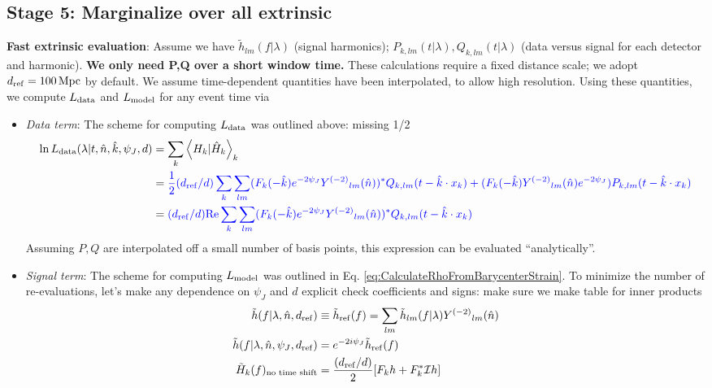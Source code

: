 \documentclass[twocolumn,prd,nofootinbib]{revtex4}
\newcommand\editremark[1]{{\color{red} #1}}
\newcommand\unit[1]{\, {\rm #1}}
\newcommand\Y[1]{Y^{(#1)}{}}
\newcommand\qmstateproduct[2]{\left\langle#1|#2\right\rangle}
\begin{document}
\begin{widetext}
\subsection{Stage 5: Marginalize over all extrinsic }

\noindent \textbf{Fast extrinsic evaluation}: Assume we have $\tilde{h}_{lm}(f|\lambda)$ (signal harmonics);
$P_{k,lm}(t|\lambda),Q_{k,lm}(t|\lambda)$ (data versus signal for each detector and harmonic).  \textbf{We only need P,Q
  over a short window time.}  These calculations
require a fixed distance scale; we adopt $d_{\rm ref}=100\unit{Mpc}$ by default.  We assume time-dependent quantities
have been interpolated, to allow high resolution.  Using these quantities, we compute
$L_{\rm data}$ and $L_{\rm model}$ for any event time via
\begin{itemize}
\item \emph{Data term}:  The scheme for computing $L_{\rm data}$ was outlined above: \editremark{missing 1/2}
\begin{align}
\ln L_{\rm data}(\lambda|t,\hat{n},\hat{k},\psi_J,d) &=  \sum_k\qmstateproduct{H_k}{\hat{H}_k}_k \nonumber \\
& =
{\color{blue} \frac{1}{2} (d_{\rm ref}/d) \sum_k \sum_{lm}(F_k(-\hat{k}) e^{-2\psi_J} \Y{-2}_{lm}(\hat{n}))^* Q_{k,lm}(t-\hat{k}\cdot x_k)
   + (F_k(-\hat{k}) \Y{-2}_{lm}(\hat{n}) e^{-2\psi_J}) P_{k,lm}(t-\hat{k}\cdot x_k) 
} \nonumber \\
&={\color{blue}  (d_{\rm ref}/d) \text{Re} \sum_k \sum_{lm}(F_k(-\hat{k}) e^{-2\psi_J} \Y{-2}_{lm}(\hat{n}))^* Q_{k,lm}(t-\hat{k}\cdot x_k)}
\end{align}
Assuming $P,Q$ are interpolated off a small number of basis points, this expression can be evaluated ``analytically''.
\item \emph{Signal term}:  The scheme for computing $L_{\rm model}$ was outlined in
  Eq. \ref{eq:CalculateRhoFromBarycenterStrain}.     To minimize the number of re-evaluations, let's make any dependence on
  $\psi_J$ and $d$ explicit
\editremark{check coefficients and signs: make sure we make table for inner products}
\begin{align}
\tilde{h}(f|\lambda,\hat{n},d_{\rm ref}) &\equiv \tilde{h}_{\rm ref}(f) = \sum_{lm} \tilde{h}_{lm}(f|\lambda) \Y{-2}_{lm}(\hat{n}) \\
\tilde{h}(f|\lambda,\hat{n},\psi_J,d_{\rm ref})&= e^{-2i\psi_J} \tilde{h}_{\rm ref}(f) \\
\tilde{H}_k(f)_{\text{no time shift}} &= \frac{(d_{\rm ref}/d)}{2}[F_k h + F^*_k {\cal I} h]

\end{align}
\end{itemize}
\end{widetext}
\end{document}
